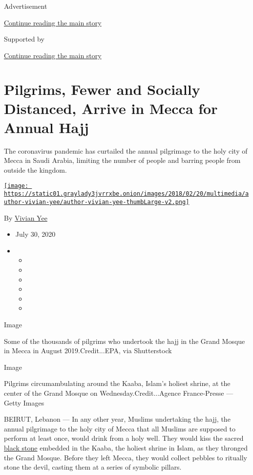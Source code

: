 Advertisement

\protect\hyperlink{after-top}{Continue reading the main story}

Supported by

\protect\hyperlink{after-sponsor}{Continue reading the main story}

\hypertarget{pilgrims-fewer-and-socially-distanced-arrive-in-mecca-for-annual-hajj}{%
\section{Pilgrims, Fewer and Socially Distanced, Arrive in Mecca for
Annual
Hajj}\label{pilgrims-fewer-and-socially-distanced-arrive-in-mecca-for-annual-hajj}}

The coronavirus pandemic has curtailed the annual pilgrimage to the holy
city of Mecca in Saudi Arabia, limiting the number of people and barring
people from outside the kingdom.

\href{https://www.nytimes3xbfgragh.onion/by/vivian-yee}{\texttt{[image: https://static01.graylady3jvrrxbe.onion/images/2018/02/20/multimedia/author-vivian-yee/author-vivian-yee-thumbLarge-v2.png]}}

By \href{https://www.nytimes3xbfgragh.onion/by/vivian-yee}{Vivian Yee}

\begin{itemize}
\item
  July 30, 2020
\item
  \begin{itemize}
  \item
  \item
  \item
  \item
  \item
  \item
  \end{itemize}
\end{itemize}

Image

Some of the thousands of pilgrims who undertook the hajj in the Grand
Mosque in Mecca in August 2019.Credit...EPA, via Shutterstock

Image

Pilgrims circumambulating around the Kaaba, Islam's holiest shrine, at
the center of the Grand Mosque on Wednesday.Credit...Agence
France-Presse --- Getty Images

BEIRUT, Lebanon --- In any other year, Muslims undertaking the hajj, the
annual pilgrimage to the holy city of Mecca that all Muslims are
supposed to perform at least once, would drink from a holy well. They
would kiss the sacred
\href{https://www.britannica.com/topic/Black-Stone-of-Mecca}{black
stone} embedded in the Kaaba, the holiest shrine in Islam, as they
thronged the Grand Mosque. Before they left Mecca, they would collect
pebbles to ritually stone the devil, casting them at a series of
symbolic pillars.

